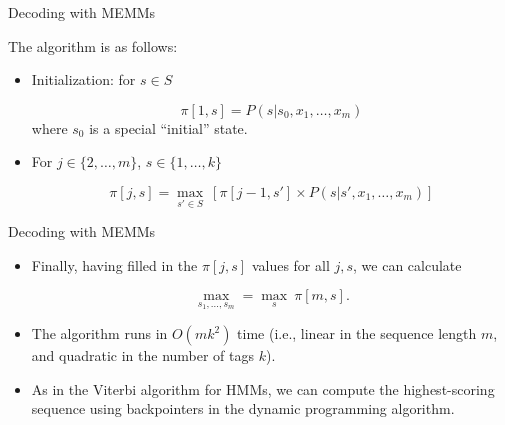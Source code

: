 \documentclass[handout]{beamer}
\begin{document}
\begin{frame}{Decoding with MEMMs}
\begin{scriptsize}
The algorithm is as follows:

\begin{itemize}

\item  Initialization: for $s \in  S$

\begin{displaymath}
  \pi[1,s] = P (s | s_0,x_1,\dots,x_m)
\end{displaymath}
where $s_0$ is a special ``initial'' state.

\item For $j \in \{2,\dots,m\}$, $s \in  \{1,\dots,k\}$

\begin{displaymath}
  \pi[j,s] =  \max_{s' \in S} \ [\pi[j-1,s'] \times P (s | s',x_1,\dots,x_m)]
\end{displaymath}

\end{itemize}



\end{scriptsize}
\end{frame}



\begin{frame}{Decoding with MEMMs}
\begin{scriptsize}

\begin{itemize}

\item  Finally, having filled in the $\pi[j,s]$ values for all $j, s$, we can calculate

\begin{displaymath}
  \max_{s_1,\dots,s_m} = \max_{s} \ \pi[m,s].
\end{displaymath}


\item The algorithm runs in $O(mk^2)$ time (i.e., linear in the sequence length $m$,
and quadratic in the number of tags $k$).


\item As in the Viterbi algorithm for HMMs, we can compute the highest-scoring sequence using backpointers in the dynamic programming algorithm.

\end{itemize}


\end{scriptsize}
\end{frame}
\end{document}
